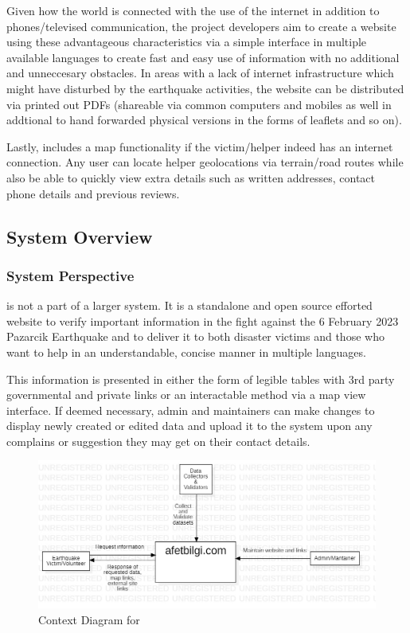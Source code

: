 Given how the world is connected with the use of the internet in addition to phones/televised communication, the project developers aim to create a website using these advantageous characteristics via a simple interface in multiple available languages to create fast and easy use of information with no additional and unneccesary obstacles. In areas with a lack of internet infrastructure which might have disturbed by the earthquake activities, the website can be distributed via printed out PDFs (shareable via common computers and mobiles as well in addtional to hand forwarded physical versions in the forms of leaflets and so on).

Lastly, \afetbilgi includes a map functionality if the victim/helper indeed has an internet connection. Any user can locate helper geolocations via terrain/road routes while also be able to quickly view extra details such as written addresses, contact phone details and previous reviews.

\subsection{System Overview}

\subsubsection{System Perspective}

\afetbilgi \cite{afetbilgi} is not a part of a larger system. It is a standalone and open source efforted website to verify important information in the fight against the 6 February 2023 Pazarcik Earthquake and to deliver it to both disaster victims and those who want to help in an understandable, concise manner in multiple languages.

This information is presented in either the form of legible tables with 3rd party governmental and private links or an interactable method via a map view interface. If deemed necessary, admin and maintainers can make changes to display newly created or edited data and upload it to the system upon any complains or suggestion they may get on their contact details.

\begin{figure}[H]
  \centering
  \includegraphics[width=\textwidth]{img/context-diagram.jpg}
  \caption{Context Diagram for \afetbilgi}
\end{figure}

